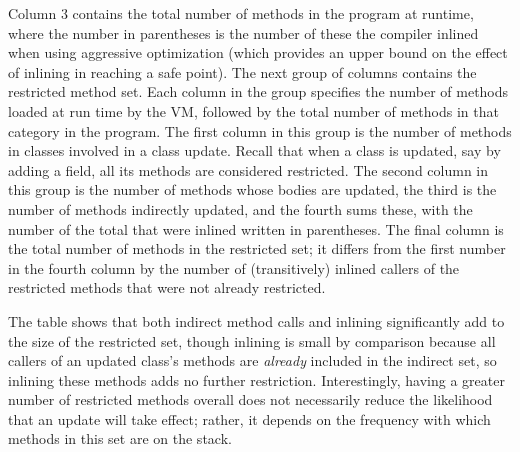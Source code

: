Column 3 contains the total number
of methods in the program at runtime, where the number in parentheses is the
number of these the compiler inlined when using aggressive optimization
(which provides an upper bound on the effect of inlining in reaching a
safe point).  The next group of columns contains the restricted method
set. Each column in the group specifies the number of methods loaded at
run time by the VM, followed by the total number of methods in that
category in the program. The first column in this group is the number of methods in
classes involved in a class update. Recall that when a class is updated, say by adding
a field, all its methods are considered restricted. The second column in this group is the number of methods whose
bodies are updated, the third is the number of methods
indirectly updated, and the fourth sums these, with the number of the
total that were inlined written in parentheses. %
The final column is
the total number of methods in the restricted set; it differs from the
first number in the fourth column by the number of (transitively)
inlined callers of the restricted methods that were not already
restricted.

The table shows that both indirect method calls and inlining 
significantly add to the size of the restricted set,
though inlining is small by comparison because all callers of an
updated class's methods are \emph{already} included in the indirect
set, so inlining these methods adds no further restriction.
Interestingly, having a greater number of restricted methods overall
does not necessarily reduce the likelihood that an update will take
effect; rather, it depends on the frequency with which methods in this
set are on the stack.

